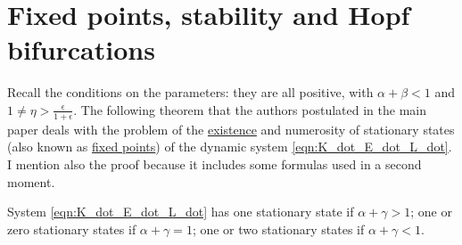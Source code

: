 \section{Fixed points, stability and Hopf bifurcations} \label{Sec:fix_pnt_stab_Hopf_bif}
Recall the conditions on the parameters: they are all positive, with $\alpha+\beta<1$ and $1\neq \eta>\frac{\epsilon}{1+\epsilon}$. The following theorem that the authors postulated in the main paper \cite{antoci_poverty_2011} deals with the problem of the \underline{existence} and numerosity of stationary states (also known as \underline{fixed points}) of the dynamic system \eqref{eqn:K_dot_E_dot_L_dot}. I mention also the proof because it includes some formulas used in a second moment.
\begin{thm} \label{thm:existence_and_num_equilibria}
	System \eqref{eqn:K_dot_E_dot_L_dot} has one stationary state if $\alpha+\gamma>1$; one or zero stationary states if $\alpha+\gamma=1$; one or two stationary states if $\alpha+\gamma<1$.
\end{thm}
